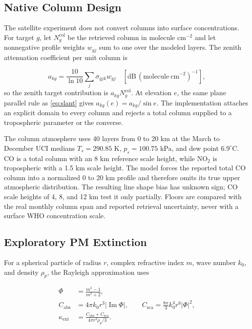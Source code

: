 \documentclass[conference]{IEEEtran}
\begin{document}
\subsection{Native Column Design}

The satellite experiment does not convert columns into surface concentrations. For target $g$, let $N_g^{\mathrm{col}}$ be the retrieved column in molecule cm$^{-2}$ and let nonnegative profile weights $w_{gj}$ sum to one over the modeled layers. The zenith attenuation coefficient per unit column is

\begin{equation}
a_{kg}=\frac{10}{\ln 10}\sum_j \sigma_{gjk}w_{gj}
\quad [\mathrm{dB}\,(\mathrm{molecule\ cm}^{-2})^{-1}],
\label{eq:columndesign}
\end{equation}
so the zenith target contribution is $a_{kg}N_g^{\mathrm{col}}$. At elevation $e$, the same plane parallel rule as \eqref{eq:slant} gives $a_{kg}(e)=a_{kg}/\sin e$. The implementation attaches an explicit domain to every column and rejects a total column supplied to a tropospheric parameter or the converse.

The column atmosphere uses 40 layers from 0 to 20 km at the March to December UCI medians $T_s=290.85$ K, $p_s=100.75$ kPa, and dew point $6.9^\circ$C. CO is a total column with an 8 km reference scale height, while NO$_2$ is tropospheric with a 1.5 km scale height. The model forces the reported total CO column into a normalized 0 to 20 km profile and therefore omits its true upper atmospheric distribution. The resulting line shape bias has unknown sign; CO scale heights of 4, 8, and 12 km test it only partially. Floors are compared with the real monthly column span and reported retrieval uncertainty, never with a surface WHO concentration scale.

\subsection{Exploratory PM Extinction}

For a spherical particle of radius $r$, complex refractive index $m$, wave number $k_0$, and density $\rho_p$, the Rayleigh approximation uses \cite{bohren1983}

\begin{align}
\Phi &= \frac{m^2-1}{m^2+2}, \\
C_{\mathrm{abs}} &=4\pi k_0 r^3|\operatorname{Im}\Phi|,\qquad
C_{\mathrm{sca}}=\frac{8\pi}{3}k_0^4r^6|\Phi|^2,\\
\kappa_{\mathrm{ext}}&=\frac{C_{\mathrm{abs}}+C_{\mathrm{sca}}}
{4\pi r^3\rho_p/3}.
\label{eq:pm}
\end{align}
\end{document}
